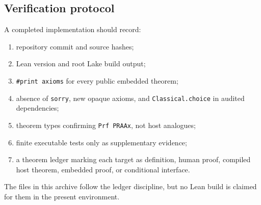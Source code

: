 \subsection{Verification protocol}

A completed implementation should record:

\begin{enumerate}
\item repository commit and source hashes;
\item Lean version and root Lake build output;
\item \texttt{\#print axioms} for every public embedded theorem;
\item absence of \texttt{sorry}, new opaque axioms, and
\texttt{Classical.choice} in audited dependencies;
\item theorem types confirming \texttt{Prf PRAAx}, not host analogues;
\item finite executable tests only as supplementary evidence;
\item a theorem ledger marking each target as definition, human proof,
compiled host theorem, embedded proof, or conditional interface.
\end{enumerate}

The files in this archive follow the ledger discipline, but no Lean build is
claimed for them in the present environment.
